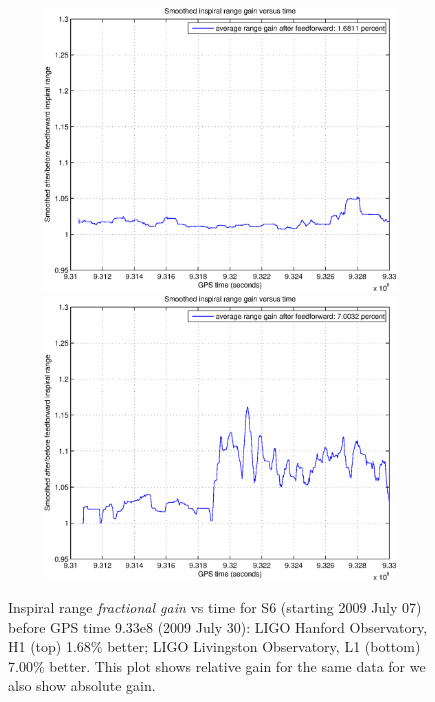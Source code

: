 \begin{figure}
\begin{center}
\includegraphics[height=75mm, width=150mm]{figure15a.eps}
\includegraphics[height=75mm, width=150mm]{figure15b.eps}
\caption{Inspiral range \textit{fractional gain} vs time for S6 (starting 2009 July 07) before GPS time 9.33e8 (2009 July 30):
LIGO Hanford Observatory, H1 (top) 1.68\% better; LIGO Livingston Observatory, L1 (bottom) 7.00\% better. This plot shows relative gain for the same data for we also show absolute gain.}
\label{S6inspiralRangeGain}
\end{center}
\end{figure}

